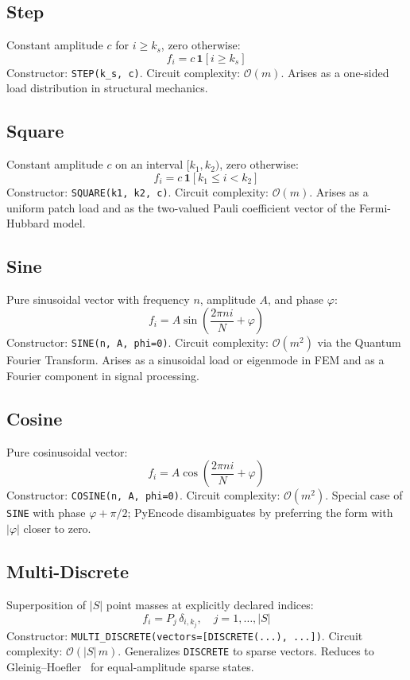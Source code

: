 \documentclass[10pt,twocolumn]{article}
\begin{document}
\subsection*{Step}
Constant amplitude $c$ for $i \geq k_s$, zero otherwise:
\[
  f_i = c\,\mathbf{1}[i \geq k_s]
\]
Constructor: \texttt{STEP(k\_s, c)}.
Circuit complexity: $\mathcal{O}(m)$.
Arises as a one-sided load distribution in structural mechanics.

\subsection*{Square}
Constant amplitude $c$ on an interval $[k_1, k_2)$, zero
otherwise:
\[
  f_i = c\,\mathbf{1}[k_1 \leq i < k_2]
\]
Constructor: \texttt{SQUARE(k1, k2, c)}.
Circuit complexity: $\mathcal{O}(m)$.
Arises as a uniform patch load and as the two-valued Pauli
coefficient vector of the Fermi-Hubbard model.

\subsection*{Sine}
Pure sinusoidal vector with frequency $n$, amplitude $A$,
and phase $\varphi$:
\[
  f_i = A\sin\!\left(\frac{2\pi n i}{N} + \varphi\right)
\]
Constructor: \texttt{SINE(n, A, phi=0)}.
Circuit complexity: $\mathcal{O}(m^2)$ via the Quantum
Fourier Transform.
Arises as a sinusoidal load or eigenmode in FEM and as a
Fourier component in signal processing.

\subsection*{Cosine}
Pure cosinusoidal vector:
\[
  f_i = A\cos\!\left(\frac{2\pi n i}{N} + \varphi\right)
\]
Constructor: \texttt{COSINE(n, A, phi=0)}.
Circuit complexity: $\mathcal{O}(m^2)$.
Special case of \texttt{SINE} with phase $\varphi + \pi/2$;
PyEncode disambiguates by preferring the form with
$|\varphi|$ closer to zero.

\subsection*{Multi-Discrete}
Superposition of $|S|$ point masses at explicitly declared
indices:
\[
  f_i = P_j\,\delta_{i,k_j}, \quad j = 1,\ldots,|S|
\]
Constructor:
\texttt{MULTI\_DISCRETE(vectors=[DISCRETE(...), ...])}.
Circuit complexity: $\mathcal{O}(|S|\,m)$.
Generalizes \texttt{DISCRETE} to sparse vectors. Reduces
to Gleinig--Hoefler~\cite{gleinig2021} for equal-amplitude
sparse states.
\end{document}

